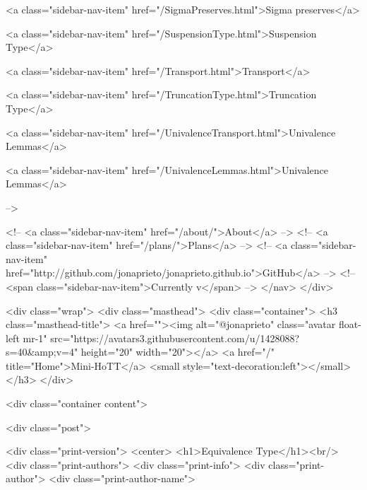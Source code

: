       
        
          <a class="sidebar-nav-item" href="/SigmaPreserves.html">Sigma preserves</a>
        
      
    
      
        
          <a class="sidebar-nav-item" href="/SuspensionType.html">Suspension Type</a>
        
      
    
      
        
          <a class="sidebar-nav-item" href="/Transport.html">Transport</a>
        
      
    
      
        
          <a class="sidebar-nav-item" href="/TruncationType.html">Truncation Type</a>
        
      
    
      
        
          <a class="sidebar-nav-item" href="/UnivalenceTransport.html">Univalence Lemmas</a>
        
      
    
      
        
          <a class="sidebar-nav-item" href="/UnivalenceLemmas.html">Univalence Lemmas</a>
        
      
     -->

    <!-- <a class="sidebar-nav-item" href="/about/">About</a> -->
    <!-- <a class="sidebar-nav-item" href="/plans/">Plans</a> -->
    <!-- <a class="sidebar-nav-item" href="http://github.com/jonaprieto/jonaprieto.github.io">GitHub</a> -->
    <!-- <span class="sidebar-nav-item">Currently v</span> -->
  </nav>
</div>

    <div class="wrap">
      <div class="masthead">
        <div class="container">
          <h3 class="masthead-title">
            <a href=""><img alt="@jonaprieto" class="avatar float-left mr-1" src="https://avatars3.githubusercontent.com/u/1428088?s=40&amp;v=4" height="20" width="20"></a>
            <a href="/" title="Home">Mini-HoTT</a>
            <small style="text-decoration:left"></small>
          </h3>
        </div>
      
      <div class="container content">
        







<div class="post">

  <div class="print-version">
    <center>
      <h1>Equivalence Type</h1><br/>
        <div class="print-authors">
          <div class="print-info">
            <div class="print-author">
              <div class="print-author-name">
                
